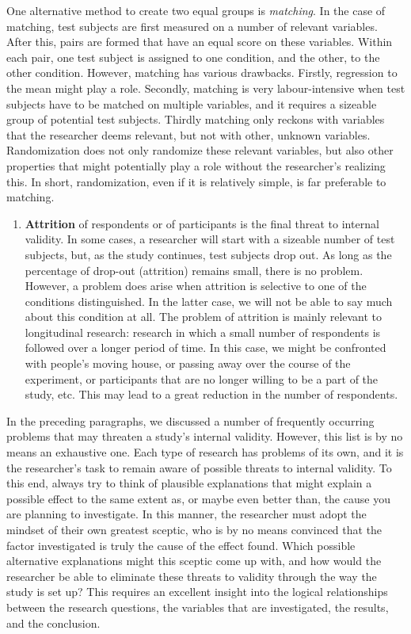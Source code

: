 \documentclass[
]{book}
\providecommand{\tightlist}{%
  \setlength{\itemsep}{0pt}\setlength{\parskip}{0pt}}
\begin{document}
One alternative method to create two equal groups is \emph{matching}. In the case of matching, test subjects are first measured on a number of relevant variables. After this, pairs are formed that have an equal score on these variables. Within each pair, one test subject is assigned to one condition, and the other, to the other condition. However, matching has various drawbacks. Firstly, regression to the mean might play a role. Secondly, matching is very labour-intensive when test subjects have to be matched on multiple variables, and it requires a sizeable group of potential test subjects. Thirdly matching only reckons with variables that the researcher deems relevant, but not with other, unknown variables. Randomization does not only randomize these relevant variables, but also other properties that might potentially play a role without the researcher's realizing this. In short, randomization, even if it is relatively simple, is far preferable to matching.

\begin{enumerate}
\def\labelenumi{\arabic{enumi}.}
\setcounter{enumi}{5}
\tightlist
\item
  \textbf{Attrition} of respondents or of participants is the final threat to internal validity. In some cases, a researcher will start with a sizeable number of test subjects, but, as the study continues, test subjects drop out. As long as the percentage of drop-out (attrition) remains small, there is no problem. However, a problem does arise when attrition is selective to one of the conditions distinguished. In the latter case, we will not be able to say much about this condition at all. The problem of attrition is mainly relevant to longitudinal research: research in which a small number of respondents is followed over a longer period of time. In this case, we might be confronted with people's moving house, or passing away over the course of the experiment, or participants that are no longer willing to be a part of the study, etc. This may lead to a great reduction in the number of respondents.
\end{enumerate}

In the preceding paragraphs, we discussed a number of frequently occurring problems that may threaten a study's internal validity. However, this list is by no means an exhaustive one. Each type of research has problems of its own, and it is the researcher's task to remain aware of possible threats to internal validity. To this end, always try to think of plausible explanations that might explain a possible effect to the same extent as, or maybe even better than, the cause you are planning to investigate. In this manner, the researcher must adopt the mindset of their own greatest sceptic, who is by no means convinced that the factor investigated is truly the cause of the effect found. Which possible alternative explanations might this sceptic come up with, and how would the researcher be able to eliminate these threats to validity through the way the study is set up? This requires an excellent insight into the logical relationships between the research questions, the variables that are investigated, the results, and the conclusion.
\end{document}
